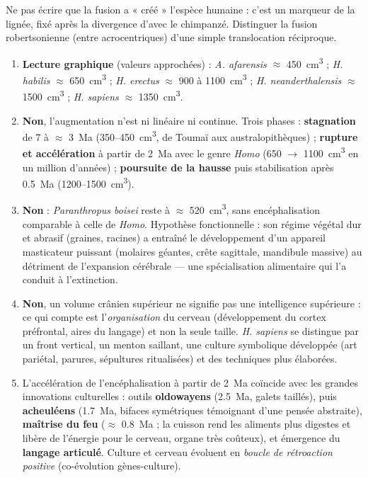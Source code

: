 \documentclass[11pt]{article}
\begin{document}
\begin{attention}
Ne pas écrire que la fusion a « créé » l'espèce humaine : c'est un marqueur de la lignée, fixé après la divergence d'avec le chimpanzé. Distinguer la fusion robertsonienne (entre acrocentriques) d'une simple translocation réciproque.
\end{attention}

\begin{corrige}
\begin{enumerate}
    \item \textbf{Lecture graphique} (valeurs approchées) : \emph{A. afarensis} $\approx$ \SI{450}{cm^3} ; \emph{H. habilis} $\approx$ \SI{650}{cm^3} ; \emph{H. erectus} $\approx$ 900 à \SI{1100}{cm^3} ; \emph{H. neanderthalensis} $\approx$ \SI{1500}{cm^3} ; \emph{H. sapiens} $\approx$ \SI{1350}{cm^3}.
    \item \textbf{Non}, l'augmentation n'est ni linéaire ni continue. Trois phases : \textbf{stagnation} de 7 à $\approx$ \SI{3}{Ma} (350--\SI{450}{cm^3}, de Toumaï aux australopithèques) ; \textbf{rupture et accélération} à partir de \SI{2}{Ma} avec le genre \emph{Homo} (650 $\rightarrow$ \SI{1100}{cm^3} en un million d'années) ; \textbf{poursuite de la hausse} puis stabilisation après \SI{0,5}{Ma} (1200--\SI{1500}{cm^3}).
    \item \textbf{Non} : \emph{Paranthropus boisei} reste à $\approx$ \SI{520}{cm^3}, sans encéphalisation comparable à celle de \emph{Homo}. Hypothèse fonctionnelle : son régime végétal dur et abrasif (graines, racines) a entraîné le développement d'un appareil masticateur puissant (molaires géantes, crête sagittale, mandibule massive) au détriment de l'expansion cérébrale — une spécialisation alimentaire qui l'a conduit à l'extinction.
    \item \textbf{Non}, un volume crânien supérieur ne signifie pas une intelligence supérieure : ce qui compte est l'\emph{organisation} du cerveau (développement du cortex préfrontal, aires du langage) et non la seule taille. \emph{H. sapiens} se distingue par un front vertical, un menton saillant, une culture symbolique développée (art pariétal, parures, sépultures ritualisées) et des techniques plus élaborées.
    \item L'accélération de l'encéphalisation à partir de \SI{2}{Ma} coïncide avec les grandes innovations culturelles : outils \textbf{oldowayens} (\SI{2,5}{Ma}, galets taillés), puis \textbf{acheuléens} (\SI{1,7}{Ma}, bifaces symétriques témoignant d'une pensée abstraite), \textbf{maîtrise du feu} ($\approx$ \SI{0,8}{Ma} ; la cuisson rend les aliments plus digestes et libère de l'énergie pour le cerveau, organe très coûteux), et émergence du \textbf{langage articulé}. Culture et cerveau évoluent en \emph{boucle de rétroaction positive} (co-évolution gènes-culture).
\end{enumerate}
\end{corrige}
\end{document}
